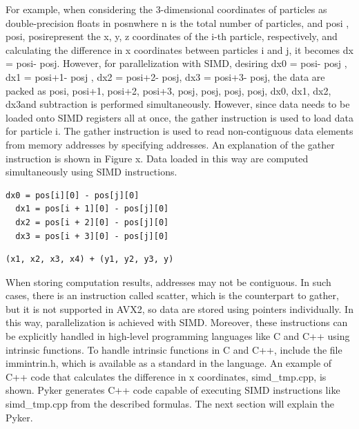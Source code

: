 \documentclass[ams, a4j]{U-AizuGT}
\begin{document}
For example, when considering the 3-dimensional coordinates of particles as double-precision floats 
in pos\lbrack n\rbrack {}\rbrack  \lparen where n is the total number of particles, and pos\lbrack i \rbrack {}\rbrack , pos\lbrack i\rbrack {}\rbrack , 
pos\lbrack i\rbrack {}\rbrack  represent the x, y, z coordinates 
of the i-th particle, respectively\rparen, and calculating the difference in x coordinates between particles i and j, it becomes dx = 
pos\lbrack i\rbrack {}\rbrack  - pos\lbrack j\rbrack {}\rbrack . However, for parallelization with SIMD, desiring dx0 = pos\lbrack i\rbrack {}\rbrack  - pos\lbrack j \rbrack {}\rbrack , dx1 = pos\lbrack i+1\rbrack {}\rbrack  - pos\lbrack j\rbrack {}\rbrack 
, dx2 = pos\lbrack i+2\rbrack {}\rbrack  - pos\lbrack j\rbrack {}\rbrack , dx3 = pos\lbrack i+3\rbrack {}\rbrack  - pos\lbrack j\rbrack {}\rbrack , 
the data are packed as \lparen pos\lbrack i\rbrack {}\rbrack , pos\lbrack i+1\rbrack {}\rbrack , pos\lbrack i+2\rbrack {}\rbrack , pos\lbrack  i+3\rbrack {}\rbrack \rparen,
\lparen pos\lbrack  j\rbrack {}\rbrack , pos\lbrack  j\rbrack {}\rbrack , pos\lbrack  j\rbrack {}\rbrack , pos\lbrack  j\rbrack {}\rparen, \lparen dx0, dx1, dx2, dx3\rparen and subtraction is performed simultaneously. However, since data needs
to be loaded onto SIMD registers all at once, the gather instruction is used to load data for particle i. The gather instruction is used
to read non-contiguous data elements from memory addresses by specifying addresses. An explanation of the gather instruction is shown in 
Figure x. Data loaded in this way are computed simultaneously using SIMD instructions. 

\begin{lstlisting}[frame=single]
  dx0 = pos[i][0] - pos[j][0]
  dx1 = pos[i + 1][0] - pos[j][0]
  dx2 = pos[i + 2][0] - pos[j][0]
  dx3 = pos[i + 3][0] - pos[j][0]
\end{lstlisting}

\begin{lstlisting}[frame=single]
  (x1, x2, x3, x4) + (y1, y2, y3, y)

\end{lstlisting}


When storing computation results, addresses may 
not be contiguous. In such cases, there is an instruction called scatter, which is the counterpart to gather, but it is not supported 
in AVX2, so data are stored using pointers individually. In this way, parallelization is achieved with SIMD. Moreover, these instructions
can be explicitly handled in high-level programming languages like C and C++ using intrinsic functions. To handle intrinsic functions 
in C and C++, include the file immintrin.h, which is available as a standard in the language. An example of C++ code that calculates the difference in x coordinates, simd\_tmp.cpp, is shown. { Pyker}  generates C++ code capable of executing SIMD instructions like simd\_tmp.cpp
from the described formulas. The next section will explain the Pyker.
\end{document}
